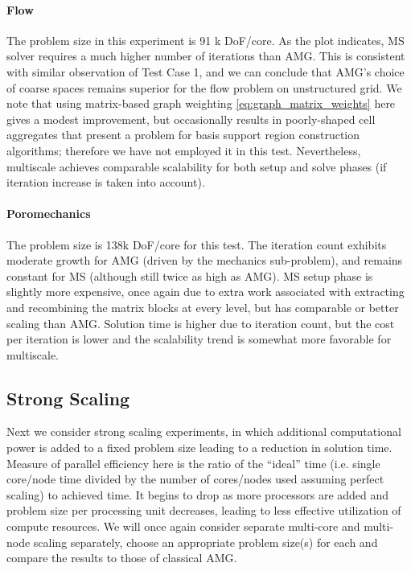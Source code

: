 \paragraph{Flow}
The problem size in this experiment is 91 k DoF/core.   As the plot indicates, MS solver requires a much higher number of iterations than AMG.   This is consistent with similar observation of Test Case 1, and we can conclude that AMG's choice of coarse spaces remains superior for the flow problem on unstructured grid.   We note that using matrix-based graph weighting \cref{eq:graph_matrix_weights} here gives a modest improvement, but occasionally results in poorly-shaped cell aggregates that present a problem for basis support region construction algorithms; therefore we have not employed it in this test.   Nevertheless, multiscale achieves comparable scalability for both setup and solve phases (if iteration increase is taken into account).

\paragraph{Poromechanics}
The problem size is 138k DoF/core for this test.   The iteration count exhibits moderate growth for AMG (driven by the mechanics sub-problem), and remains constant for MS (although still twice as high as AMG).   MS setup phase is slightly more expensive, once again due to extra work associated with extracting and recombining the matrix blocks at every level, but has comparable or better scaling than AMG.   Solution time is higher due to iteration count, but the cost per iteration is lower and the scalability trend is somewhat more favorable for multiscale.

\subsection{Strong Scaling}
\label{subsec:par_scaling_strong}

Next we consider strong scaling experiments, in which additional computational power is added to a fixed problem size leading to a reduction in solution time.   Measure of parallel efficiency here is the ratio of the ``ideal'' time (i.e. single core/node time divided by the number of cores/nodes used assuming perfect scaling) to achieved time.   It begins to drop as more processors are added and problem size per processing unit decreases, leading to less effective utilization of compute resources.    We will once again consider separate multi-core and multi-node scaling separately, choose an appropriate problem size(s) for each and compare the results to those of classical AMG.

